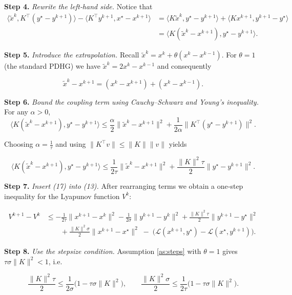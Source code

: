\documentclass{article}
\begin{document}
\noindent\textbf{Step 4.} \emph{Rewrite the left‑hand side.}  
Notice that
\[
\begin{aligned}
\langle \tilde{x}^{k},K^{\top}(y^{\star}-y^{k+1})\rangle
-\langle K^{\top}y^{k+1},x^{\star}-x^{k+1}\rangle
&= \langle K\tilde{x}^{k},y^{\star}-y^{k+1}\rangle
+\langle Kx^{k+1},y^{k+1}-y^{\star}\rangle\\
&= \langle K(\tilde{x}^{k}-x^{k+1}),y^{\star}-y^{k+1}\rangle.
\end{aligned}
\tag{14}
\]

\noindent\textbf{Step 5.} \emph{Introduce the extrapolation.}  
Recall $\tilde{x}^{k}=x^{k}+\theta (x^{k}-x^{k-1})$.  For $\theta=1$ (the standard PDHG) we have  
$\tilde{x}^{k}=2x^{k}-x^{k-1}$ and consequently  

\[
\tilde{x}^{k}-x^{k+1}= (x^{k}-x^{k+1})+(x^{k}-x^{k-1}).
\tag{15}
\]

\noindent\textbf{Step 6.} \emph{Bound the coupling term using Cauchy–Schwarz and Young’s inequality.}  
For any $\alpha>0$,
\[
\langle K(\tilde{x}^{k}-x^{k+1}),y^{\star}-y^{k+1}\rangle
\le \frac{\alpha}{2}\|\tilde{x}^{k}-x^{k+1}\|^{2}
+\frac{1}{2\alpha}\|K^{\top}(y^{\star}-y^{k+1})\|^{2}.
\tag{16}
\]

Choosing $\alpha = \frac{1}{\tau}$ and using $\|K^{\top}v\|\le\|K\|\|v\|$ yields  

\[
\langle K(\tilde{x}^{k}-x^{k+1}),y^{\star}-y^{k+1}\rangle
\le \frac{1}{2\tau}\|\tilde{x}^{k}-x^{k+1}\|^{2}
+\frac{\|K\|^{2}\tau}{2}\|y^{\star}-y^{k+1}\|^{2}.
\tag{17}
\]

\noindent\textbf{Step 7.} \emph{Insert (17) into (13).}  After rearranging terms we obtain a one‑step inequality for the Lyapunov function $V^{k}$:

\[
\begin{aligned}
V^{k+1} - V^{k}
&\le -\frac{1}{2\tau}\|x^{k+1}-x^{k}\|^{2}
-\frac{1}{2\sigma}\|y^{k+1}-y^{k}\|^{2}
+\frac{\|K\|^{2}\tau}{2}\|y^{k+1}-y^{\star}\|^{2}
\\
&\qquad +\frac{\|K\|^{2}\sigma}{2}\|x^{k+1}-x^{\star}\|^{2}
\;-\;\bigl(\mathcal{L}(x^{k+1},y^{\star})-\mathcal{L}(x^{\star},y^{k+1})\bigr).
\end{aligned}
\tag{18}
\]

\noindent\textbf{Step 8.} \emph{Use the stepsize condition.}  
Assumption \ref{as:steps} with $\theta=1$ gives $\tau\sigma\|K\|^{2}<1$, i.e.

\[
\frac{\|K\|^{2}\tau}{2}\le\frac{1}{2\sigma}\bigl(1-\tau\sigma\|K\|^{2}\bigr),\qquad
\frac{\|K\|^{2}\sigma}{2}\le\frac{1}{2\tau}\bigl(1-\tau\sigma\|K\|^{2}\bigr).
\tag{19}
\]
\end{document}
